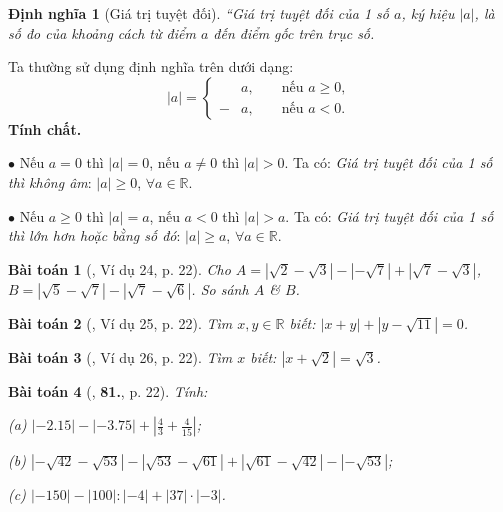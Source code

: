 \documentclass{article}
\numberwithin{equation}{section}
\newtheorem{dinhnghia}{Định nghĩa}[section]
\newtheorem{baitoan}{Bài toán}
\begin{document}
\begin{dinhnghia}[Giá trị tuyệt đối]
	``\emph{Giá trị tuyệt đối} của 1 số $a$, ký hiệu $|a|$, là số đo của khoảng cách từ điểm $a$ đến điểm gốc trên trục số.
\end{dinhnghia}
Ta thường sử dụng định nghĩa trên dưới dạng:
\begin{equation*}
	|a| = \left\{\begin{split}
		&a,&&\mbox{ nếu }a\ge 0,\\
		-&a,&&\mbox{ nếu }a < 0.
	\end{split}\right.
\end{equation*}
\textbf{Tính chất.}
\begin{enumerate*}
	\item[$\bullet$] Nếu $a = 0$ thì $|a| = 0$, nếu $a\ne 0$ thì $|a| > 0$. Ta có: \textit{Giá trị tuyệt đối của 1 số thì không âm}: $|a|\ge 0$, $\forall a\in\mathbb{R}$.
	\item[$\bullet$] Nếu $a\ge 0$ thì $|a| = a$, nếu $a < 0$ thì $|a| > a$. Ta có: \textit{Giá trị tuyệt đối của 1 số thì lớn hơn hoặc bằng số đó}: $|a|\ge a$, $\forall a\in\mathbb{R}$.
\end{enumerate*}

\begin{baitoan}[\cite{Tuyen_Toan_7}, Ví dụ 24, p. 22]
	Cho $A = |\sqrt{2} - \sqrt{3}| - |-\sqrt{7}| + |\sqrt{7} - \sqrt{3}|$, $B = |\sqrt{5} - \sqrt{7}| - |\sqrt{7} - \sqrt{6}|$. So sánh $A$ \& $B$.
\end{baitoan}	

\begin{baitoan}[\cite{Tuyen_Toan_7}, Ví dụ 25, p. 22]
	Tìm $x,y\in\mathbb{R}$ biết: $|x + y| + |y - \sqrt{11}| = 0$.
\end{baitoan}

\begin{baitoan}[\cite{Tuyen_Toan_7}, Ví dụ 26, p. 22]
	Tìm $x$ biết: $|x + \sqrt{2}| = \sqrt{3}$.
\end{baitoan}

\begin{baitoan}[\cite{Tuyen_Toan_7}, \textbf{81.}, p. 22]
	Tính:
	\begin{enumerate*}
		\item[(a)] $|-2.15| - |-3.75| + \left|\frac{4}{3} + \frac{4}{15}\right|$;
		\item[(b)] $|-\sqrt{42} - \sqrt{53}| - |\sqrt{53} - \sqrt{61}| + |\sqrt{61} - \sqrt{42}| - |-\sqrt{53}|$;
		\item[(c)] $|-150| - |100|:|-4| + |37|\cdot|-3|$.
	\end{enumerate*}
\end{baitoan}
\end{document}
